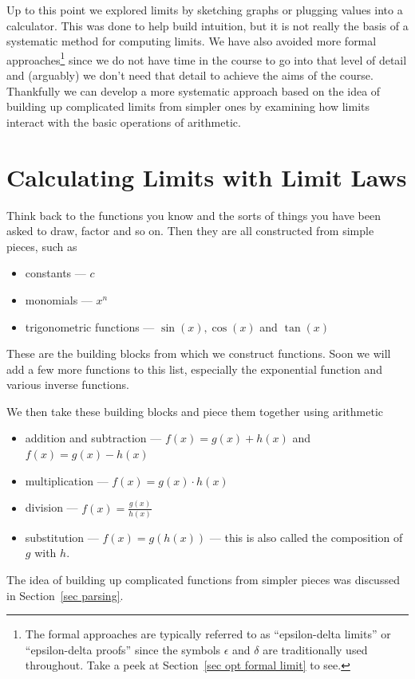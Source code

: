 Up to this point we explored limits by sketching graphs or plugging values into
a calculator. This was done to help build intuition, but it is not really the
basis of a systematic method for computing limits. We have also avoided more
formal approaches\footnote{The formal
approaches are typically referred to as ``epsilon-delta limits'' or
``epsilon-delta proofs'' since the symbols $\epsilon$ and $\delta$ are
traditionally used throughout. Take a peek at Section~\ref{sec opt
formal limit} to see.} since we do not have time in the course to go into
that level of detail and (arguably) we don't need that detail to achieve the
aims of the course. Thankfully we can develop a more systematic approach based
on the idea of building up complicated limits from simpler ones by examining how
limits interact with the basic operations of arithmetic.

\section{Calculating Limits with Limit Laws}
Think back to the functions you know and the sorts of things you have  been
asked to draw, factor and so on. Then they are all constructed from simple
pieces, such as
\begin{itemize}
 \item constants --- $c$
 \item monomials --- $x^n$
 \item trigonometric functions --- $\sin(x), \cos(x)$ and $\tan(x)$
\end{itemize}
These are the building blocks from which we construct functions. Soon we will
add a few more functions to this list, especially the exponential function and
various inverse functions.

We then take these building blocks and piece them together using arithmetic
\begin{itemize}
 \item addition and subtraction --- $f(x)  = g(x) + h(x)$ and $f(x) = g(x) -
h(x)$
 \item multiplication --- $f(x) = g(x) \cdot h(x)$
 \item division --- $f(x) = \frac{g(x)}{h(x)}$
 \item substitution --- $f(x) = g( h(x) )$ --- this is also called
the composition of $g$ with $h$.
\end{itemize}
The idea of building up complicated functions from simpler pieces was discussed
in Section~\ref{sec parsing}.

